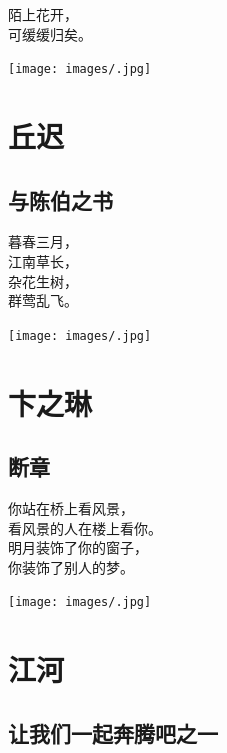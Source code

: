 \documentclass[
]{book}
\renewenvironment{quote}{\begin{VF}}{\end{VF}}
\begin{document}
\begin{quote}
陌上花开，\\
可缓缓归矣。
\end{quote}

\texttt{[image: images/.jpg]}

\hypertarget{section-12}{%
\chapter{丘迟}\label{section-12}}

\hypertarget{section-13}{%
\section{与陈伯之书}\label{section-13}}

\begin{quote}
暮春三月，\\
江南草长，\\
杂花生树，\\
群莺乱飞。
\end{quote}

\texttt{[image: images/.jpg]}

\hypertarget{section-14}{%
\chapter{卞之琳}\label{section-14}}

\hypertarget{section-15}{%
\section{断章}\label{section-15}}

\begin{quote}
你站在桥上看风景，\\
看风景的人在楼上看你。\\
明月装饰了你的窗子，\\
你装饰了别人的梦。
\end{quote}

\texttt{[image: images/.jpg]}

\hypertarget{section-16}{%
\chapter{江河}\label{section-16}}

\hypertarget{section-17}{%
\section{让我们一起奔腾吧之一}\label{section-17}}
\end{document}
